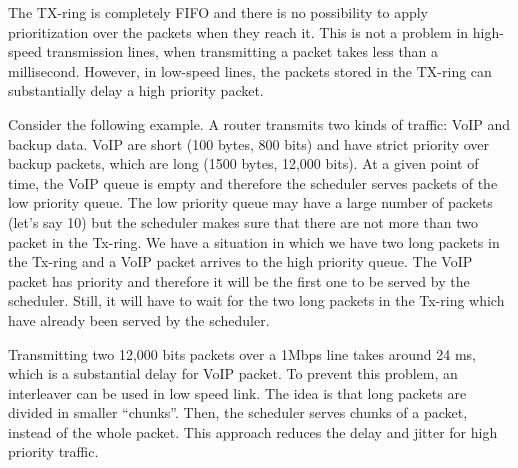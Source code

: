 The TX-ring is completely FIFO and there is no possibility to apply prioritization over the packets when they reach it.
This is not a problem in high-speed transmission lines, when transmitting a packet takes less than a millisecond.
However, in low-speed lines, the packets stored in the TX-ring can substantially delay a high priority packet.

Consider the following example.
A router transmits two kinds of traffic: VoIP and backup data.
VoIP are short (100 bytes, 800 bits) and have strict priority over backup packets, which are long (1500 bytes, 12,000 bits).
At a given point of time, the VoIP queue is empty and therefore the scheduler serves packets of the low priority queue.
The low priority queue may have a large number of packets (let's say 10) but the scheduler makes sure that there are not more than two packet in the Tx-ring.
We have a situation in which we have two long packets in the Tx-ring and a VoIP packet arrives to the high priority queue.
The VoIP packet has priority and therefore it will be the first one to be served by the scheduler.
Still, it will have to wait for the two long packets in the Tx-ring which have already been served by the scheduler.

Transmitting two 12,000 bits packets over a 1Mbps line takes around 24 ms, which is a substantial delay for VoIP packet.
To prevent this problem, an interleaver can be used in low speed link.
The idea is that long packets are divided in smaller ``chunks''.
Then, the scheduler serves chunks of a packet, instead of the whole packet.
This approach reduces the delay and jitter for high priority traffic.
